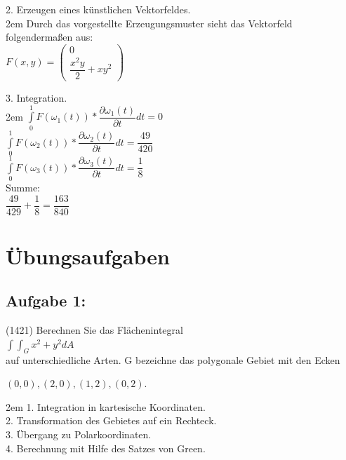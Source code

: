 \documentclass[11pt,final]{scrreprt}
\begin{document}
\par	
\endgroup

2. Erzeugen eines künstlichen Vektorfeldes.\\

\begingroup
\leftskip2em 
Durch das vorgestellte Erzeugungsmuster sieht das Vektorfeld folgendermaßen aus:\\
$ F(x, y) = \left(\begin{matrix}
0\\ \dfrac{x^2y}{2} + xy^2
\end{matrix}\right) $\\
\par	
\endgroup

3. Integration.\\

\begingroup
\leftskip2em 
$ \int\limits_0^1 F(\omega_1(t)) * \dfrac{\partial\omega_1(t)}{\partial t} dt = 0$\\

$ \int\limits_0^1 F(\omega_2(t)) * \dfrac{\partial\omega_2(t)}{\partial t} dt = \dfrac{49}{420}$\\

$ \int\limits_0^1 F(\omega_3(t)) * \dfrac{\partial\omega_3(t)}{\partial t} dt = \dfrac{1}{8}$\\

Summe:\\
$ \dfrac{49}{429} + \dfrac{1}{8} = \dfrac{163}{840} $\\

\par	
\endgroup

\section{Übungsaufgaben}

\subsection{Aufgabe 1:}
(1421) Berechnen Sie das Flächenintegral\\

$ \int\int_G x^2+y^2 dA $\\

auf unterschiedliche Arten. G bezeichne das polygonale Gebiet mit den Ecken
\begin{center}
$(0, 0), (2, 0), (1, 2), (0, 2).$
\end{center}

\begingroup
\leftskip2em 
1. Integration in kartesische Koordinaten.\\
2. Transformation des Gebietes auf ein Rechteck.\\
3. Übergang zu Polarkoordinaten.\\
4. Berechnung mit Hilfe des Satzes von Green.\\
\par	
\endgroup
\end{document}
